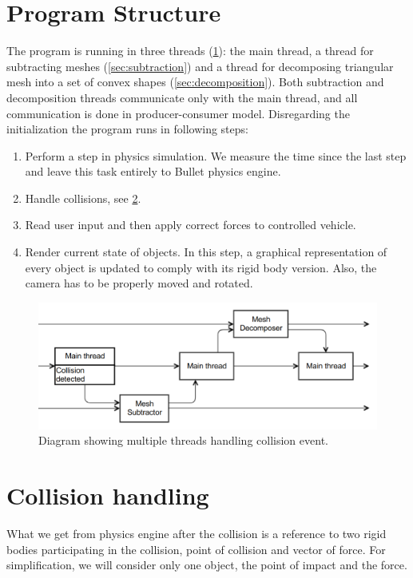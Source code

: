 \section{Program Structure}
The program is running in three threads (\cref{fig:threads}): the main thread, a thread for subtracting meshes (\cref{sec:subtraction}) and a thread for decomposing triangular mesh into a set of convex shapes (\cref{sec:decomposition}). Both subtraction and decomposition threads communicate only with the main thread, and all communication is done in producer-consumer model. Disregarding the initialization the program runs in following steps:
\begin{enumerate}
\item Perform a step in physics simulation. We measure the time since the last step and leave this task entirely to Bullet physics engine.
\item Handle collisions, see \cref{sec:collisions}.
\item Read user input and then apply correct forces to controlled vehicle.
\item Render current state of objects. In this step, a graphical representation of every object is updated to comply with its rigid body version. Also, the camera has to be properly moved and rotated.
\end{enumerate}

\begin{figure}
        \centering
        \includegraphics[width=\textwidth]{img/decompositionFlow}
        \caption{Diagram showing multiple threads handling collision event. }
        \label{fig:threads}
\end{figure}



\section{Collision handling}
\label{sec:collisions}
What we get from physics engine after the collision is a reference to two rigid bodies participating in the collision, point of collision and vector of force. For simplification, we will consider only one object, the point of impact and the force.

